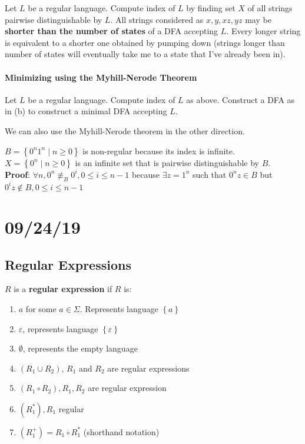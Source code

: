 \documentclass[12 pt]{article}
\begin{document}
Let $L$ be a regular language. Compute index of $L$ by finding set $X$
of all strings pairwise distinguishable by $L$. All strings considered
as $x, y, xz, yz$ may be \textbf{shorter than the number of states}
of a DFA accepting $L$. Every longer string is equivalent to a shorter
one obtained by pumping down (strings longer than number of states
will eventually take me to a state that I've already been in).

\paragraph{Minimizing using the Myhill-Nerode Theorem}
Let $L$ be a regular language. Compute index of $L$ as
above. Construct a DFA as in (b) to construct a minimal DFA accepting $L$.

We can also use the Myhill-Nerode theorem in the other direction.

$B = \left\{0^n1^n \mid n \geq 0 \right\}$ is non-regular because its
index is infinite. $X = \left\{0^n \mid n \geq 0\right\}$ is an
infinite set that is pairwise distinguishable by $B$.
\\ \textbf{Proof}: $\forall n, 0^n \not \equiv_B 0^i, 0 \leq i \leq
n-1$ because $\exists z =1^n$ such that $0^nz \in B$ but $0^iz \notin
B, 0 \leq i \leq n-1$
\section{09/24/19}
\subsection{Regular Expressions}
$R$ is a \textbf{regular expression} if $R$ is:
\begin{enumerate}
\item $a$ for some $a \in \Sigma$. Represents language $\left\{a\right\}$
\item $\varepsilon$, represents language $\left\{\varepsilon\right\}$
\item $\emptyset$, represents the empty language
\item $(R_1 \cup R_2)$, $R_1$ and $R_2$ are regular expressions
\item $(R_1 \circ R_2), R_1, R_2$ are regular expression
\item $(R_1^*), R_1$ regular
\item $(R_1^+) = R_1 \circ R_1^*$ (shorthand notation)
\end{enumerate}
\end{document}
